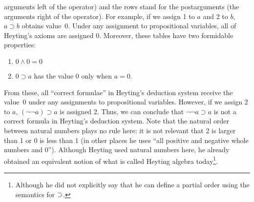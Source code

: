 arguments left of the operator) and the
rows stand for the postarguments (the arguments right of the operator).
For example, if we assign 1 to $a$ and 2 to $b$,
$a\supset b$ obtains value~0.
Under any assignment to propositional variables, all of Heyting's axioms
are assigned 0.  Moreover, these tables have two formidable properties:
\begin{enumerate}
 \item $0\land 0 = 0$
 \item $0\supset a$ has the value 0 only when $a = 0$.
\end{enumerate}
From these, all ``correct formulae'' in Heyting's deduction system
receive the value~0 under any assignments to propositional variables.
However, if we assign 2 to $a$, $(\neg \neg a)\supset a$
is assigned 2.  Thus, we can conclude that $\neg \neg a \supset a$ is
not a correct formula in Heyting's deduction system.
Note that the natural order between natural numbers
plays no rule here: it is not relevant that 2 is larger than 1 or 0 is
less than 1 (in other places he uses ``all positive and negative
whole numbers and 0'').  Although Heyting used natural numbers here, he
already obtained an equivalent notion of what is called Heyting algebra
today\footnote{Although he did not explicitly say that he can define a
partial order using the semantics for $\supset$.}.

